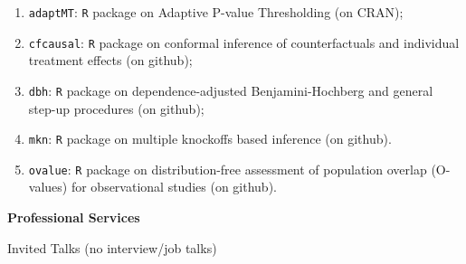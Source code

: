\documentclass{article}
\begin{document}
\begin{enumerate}
\item \texttt{adaptMT}: \texttt{R} package on Adaptive P-value Thresholding (on CRAN);
\item \texttt{cfcausal}: \texttt{R} package on conformal inference of counterfactuals and individual treatment effects (on github);
\item \texttt{dbh}: \texttt{R} package on dependence-adjusted Benjamini-Hochberg and general step-up procedures (on github);
\item \texttt{mkn}: \texttt{R} package on multiple knockoffs based inference (on github).
\item \texttt{ovalue}: \texttt{R} package on distribution-free assessment of population overlap (O-values) for observational studies (on github).
\end{enumerate}

\vspace{5mm}
\begin{large}
\noindent \textbf{Professional Services}
\end{large}
\vspace{5mm}


\begin{large}
\noindent Invited Talks (no interview/job talks)
\end{large}
\end{document}
